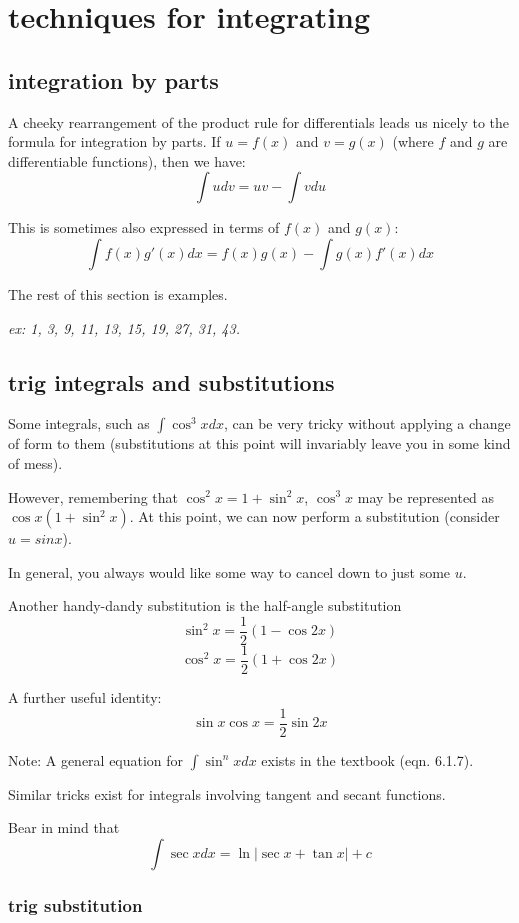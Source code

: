 \documentclass[10pt,a4paper]{report}
\begin{document}
\chapter{techniques for integrating}

\section{integration by parts}

A cheeky rearrangement of the product rule for differentials leads us nicely to the formula for integration by parts. If $u = f(x)$ and $v = g(x)$ (where $f$ and $g$ are differentiable functions), then we have:
$$
	\int u dv = uv - \int v du
$$

This is sometimes also expressed in terms of $f(x)$ and $g(x)$:
$$
	\int f(x)g'(x) dx = f(x)g(x) - \int g(x) f'(x)dx
$$

The rest of this section is examples.

\emph{ex: 1,  3,  9,  11,  13,  15,  19,  27, 31, 43.}


\section{trig integrals and substitutions}

Some integrals, such as $\int \cos^3 xdx$, can be very tricky without applying a change of form to them (substitutions at this point will invariably leave you in some kind of mess).

However, remembering that $\cos^2x = 1 + \sin^2x$, $\cos^3x$ may be represented as $\cos x (1 + \sin^2 x)$. At this point, we can now perform a substitution (consider $u = sinx$).

In general, you always would like some way to cancel down to just some $u$.

Another handy-dandy substitution is the half-angle substitution
$$
	\sin^2x = \frac{1}{2} (1 - \cos 2x)
$$
$$
	\cos^2x = \frac{1}{2} (1 + \cos 2x)
$$

A further useful identity:
$$
	\sin x \cos x = \frac{1}{2} \sin 2x
$$

Note: A general equation for $\int \sin^n x dx$ exists in the textbook (eqn. 6.1.7).

Similar tricks exist for integrals involving tangent and secant functions.

Bear in mind that
$$
	\int \sec x dx = \ln | \sec x + \tan x | + c
$$

\subsection{trig substitution}
\end{document}
